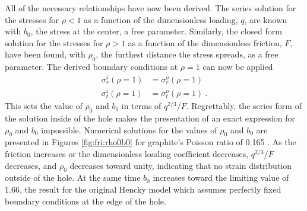 All of the necessary relationships have now been derived.
The series solution for the stresses for $\rho<1$ as a function of the dimensionless loading, $q$, are known with $b_0$, the stress at the center, a free parameter.
Similarly, the closed form solution for the stresses for $\rho>1$ as a function of the dimensionless friction, $F$, have been found, with $\rho_0$, the furthest distance the stress spreads, as a free parameter.
The derived boundary conditions at $\rho=1$ can now be applied 
\begin{align}
	\sigma_r^i(\rho=1)&=\sigma_r^o(\rho=1) \nonumber \\
	\sigma_t^i(\rho=1)&=\sigma_t^o(\rho=1) \ . \label{eq:fri:BCs}
\end{align}
This sets the value of $\rho_0$ and $b_0$ in terms of $q^{2/3}/F$.
Regrettably, the series form of the solution inside of the hole makes the presentation of an exact expression for $\rho_0$ and $b_0$ impossible.
Numerical solutions for the values of $\rho_0$ and $b_0$ are presented in Figures \ref{fig:fri:rho0b0} for graphite's Poisson ratio of 0.165 \cite{Blakslee1970}.
As the friction increases or the dimensionless loading coefficient decreases, $q^{2/3}/F$ decreases, and $\rho_0$ decreases toward unity, indicating that no strain distribution outside of the hole.
At the same time $b_0$ increases toward the limiting value of 1.66, the result for the original Hencky model which assumes perfectly fixed boundary conditions at the edge of the hole. 

